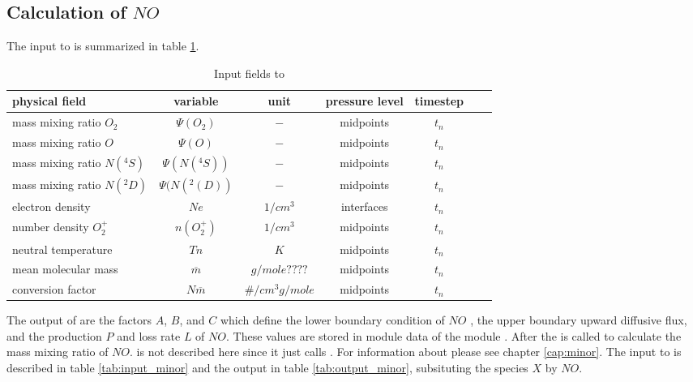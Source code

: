 \subsection{Calculation of $NO$}\label{subcap:comp_no}
%
The input to  is summarized in table
\ref{tab:input_comp_no}.
%
\begin{table}[tb]
\begin{tabular}{|p{3.5cm} ||c|c|c|c|c|c|} \hline
physical field               & variable        & unit&pressure
level& timestep
\\ \hline \hline
%
mass mixing ratio $O_2$ &       $\Psi(O_2)$              & $-$   &  midpoints & $t_n$\\
mass mixing ratio $O$ &         $\Psi(O  )$              & $-$   &  midpoints & $t_n$\\
mass mixing ratio $N(^4S)$ &       $\Psi(N(^4S))$              & $-$   &  midpoints & $t_n$\\
mass mixing ratio $N(^2D)$ &       $\Psi(N(^2(D))$              & $-$   &  midpoints & $t_n$\\
electron density&       $Ne$              & $1/cm^3$   &  interfaces & $t_n$\\
number density $O_2^+$&       $n(O_2^+)$              & $1/cm^3$   &  midpoints & $t_n$\\
neutral temperature&       $Tn$              & $K$   &  midpoints & $t_n$\\
mean molecular mass&       $\overline{m}$              & $g/mole????$   &  midpoints & $t_n$\\
conversion factor&       $N \overline{m}$              & $\#/cm^3
g/mole$   &  midpoints & $t_n$
 \\ \hline
\end{tabular}
\caption{Input fields to }
\label{tab:input_comp_no}
\end{table}
%
The output of  are the factors $A$, $B$,
and $C$ which define the lower boundary condition of  $NO$ , the
upper boundary upward diffusive flux, and the production $P$ and
loss rate $L$ of $NO$. These values are stored in module data of the
module . After  the
 is called to calculate the mass mixing
ratio of $NO$.  is not described here
since it just calls . For information about
 please see chapter \ref{cap:minor}. The input
to  is described in table
\ref{tab:input_minor} and the output in table
\ref{tab:output_minor}, subsituting the species $X$ by $NO$. \\


